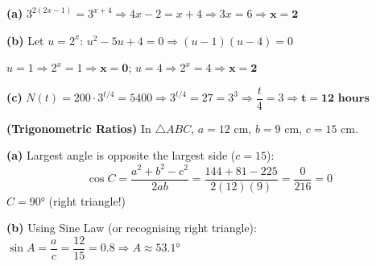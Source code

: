 \documentclass[addpoints]{exam}
\begin{document}
\begin{questions}
\begin{solution}[9cm]
\textbf{(a)} $3^{2(2x-1)} = 3^{x+4} \Rightarrow 4x - 2 = x + 4 \Rightarrow 3x = 6
\Rightarrow \mathbf{x = 2}$

\textbf{(b)} Let $u = 2^x$: $u^2 - 5u + 4 = 0 \Rightarrow (u-1)(u-4) = 0$

$u = 1 \Rightarrow 2^x = 1 \Rightarrow \mathbf{x = 0}$;\quad
$u = 4 \Rightarrow 2^x = 4 \Rightarrow \mathbf{x = 2}$

\textbf{(c)} $N(t) = 200 \cdot 3^{t/4} = 5400 \Rightarrow 3^{t/4} = 27 = 3^3
\Rightarrow \dfrac{t}{4} = 3 \Rightarrow \mathbf{t = 12 \text{ hours}}$
\end{solution}

\question \textbf{(Trigonometric Ratios)} In $\triangle ABC$, $a = 12$ cm,
$b = 9$ cm, $c = 15$ cm.
\begin{solution}[9cm]
\textbf{(a)} Largest angle is opposite the largest side ($c = 15$):
\[
\cos C = \frac{a^2+b^2-c^2}{2ab} = \frac{144+81-225}{2(12)(9)} = \frac{0}{216} = 0
\]
$C = \ang{90}$ (right triangle!)

\textbf{(b)} Using Sine Law (or recognising right triangle):
$\sin A = \dfrac{a}{c} = \dfrac{12}{15} = 0.8 \Rightarrow A \approx \ang{53.1}$


\end{solution}
\end{questions}
\end{document}
